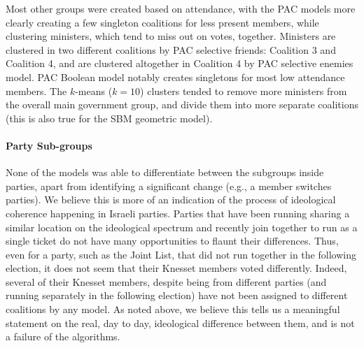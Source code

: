 Most other groups were created based on attendance, with the PAC models more
clearly creating a few singleton coalitions for less present members, while
clustering ministers, which tend to miss out on votes, together.
Ministers are clustered in two different coalitions by PAC selective friends:
Coalition 3 and Coalition 4, and are clustered altogether in Coalition 4 by PAC selective
enemies model.
PAC Boolean model notably creates singletons for most low attendance members.
The $k$-means ($k=10$) clusters tended to remove more ministers from the overall
main government group, and divide them into more separate coalitions (this is
also true for the SBM geometric model).

\paragraph{Party Sub-groups}
None of the models was able to differentiate between the subgroups inside
parties, apart from identifying a significant change (e.g., a member switches
parties).
We believe this is more of an indication of the process of ideological
coherence happening in Israeli parties.
Parties that have been running sharing a similar location on the ideological
spectrum and recently join together to run as a single ticket do not have many
opportunities to flaunt their differences.
Thus, even for a party, such as the Joint List, that did not run together in
the following election, it does not seem that their Knesset members voted
differently.
Indeed, several of their Knesset members, despite being from different parties
(and running separately in the following election) have not been assigned to
different coalitions by any model.
As noted above, we believe this tells us a meaningful statement on the real,
day to day, ideological difference between them, and is not a failure of the
algorithms.

